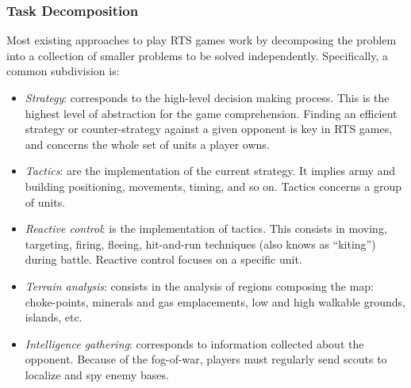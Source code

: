 \documentclass{llncs}
\begin{document}
\subsubsection{Task Decomposition}
Most existing approaches  to play RTS games work by decomposing the  problem into   a    collection   of    smaller   problems to    be   solved
independently. Specifically, a common subdivision is:
\begin{itemize}
\item {\em  Strategy}: corresponds  to the high-level  decision making
  process.  This is  the highest  level  of abstraction  for the  game
  comprehension.  Finding an  efficient  strategy or  counter-strategy
  against a given opponent is key in RTS games, and concerns the whole
  set of units a player
  owns. %
\item   {\em  Tactics}:   are  the   implementation  of   the  current
  strategy.  It  implies  army and  building  positioning,  movements,
  timing, and so on. Tactics concerns a group of
  units. %
\item {\em Reactive  control}: is the implementation  of tactics. This
  consists   in  moving,   targeting,  firing,   fleeing,  hit-and-run
  techniques  (also  knows  as  ``kiting'')  during  battle.  Reactive
  control focuses on a specific
  unit. %
%
\item  {\em Terrain  analysis}: consists  in the  analysis of  regions
  composing the map: choke-points,  minerals and gas emplacements, low
  and high walkable grounds, islands, etc.
\item  {\em   Intelligence  gathering}:  corresponds   to  information
  collected  about the  opponent. Because  of the  fog-of-war, players
  must regularly send scouts to localize and spy enemy
  bases.%
\end{itemize}
\end{document}
